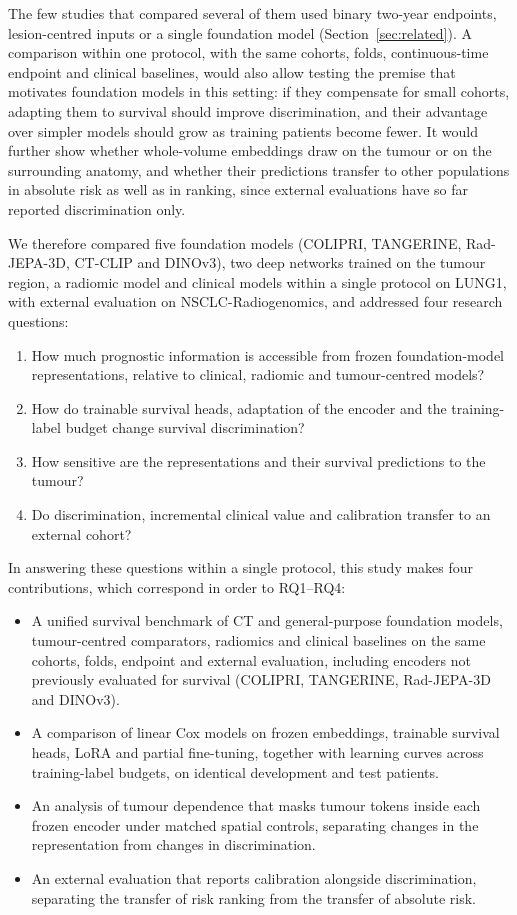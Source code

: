 The few studies that compared several of them used binary two-year endpoints, lesion-centred inputs or a single foundation model (Section~\ref{sec:related}).\cite{aerts2025tib,neukirch2026,allgower2026} A comparison within one protocol, with the same cohorts, folds, continuous-time endpoint and clinical baselines, would also allow testing the premise that motivates foundation models in this setting: if they compensate for small cohorts, adapting them to survival should improve discrimination, and their advantage over simpler models should grow as training patients become fewer. It would further show whether whole-volume embeddings draw on the tumour or on the surrounding anatomy, and whether their predictions transfer to other populations in absolute risk as well as in ranking, since external evaluations have so far reported discrimination only.

We therefore compared five foundation models (COLIPRI, TANGERINE, Rad-JEPA-3D, CT-CLIP and DINOv3), two deep networks trained on the tumour region, a radiomic model and clinical models within a single protocol on LUNG1, with external evaluation on NSCLC-Radiogenomics,\cite{bakr2018} and addressed four research questions:
\begin{enumerate}
\item[RQ1] How much prognostic information is accessible from frozen foundation-model representations, relative to clinical, radiomic and tumour-centred models?
\item[RQ2] How do trainable survival heads, adaptation of the encoder and the training-label budget change survival discrimination?
\item[RQ3] How sensitive are the representations and their survival predictions to the tumour?
\item[RQ4] Do discrimination, incremental clinical value and calibration transfer to an external cohort?
\end{enumerate}

In answering these questions within a single protocol, this study makes four contributions, which correspond in order to RQ1--RQ4:
\begin{itemize}
\item A unified survival benchmark of CT and general-purpose foundation models, tumour-centred comparators, radiomics and clinical baselines on the same cohorts, folds, endpoint and external evaluation, including encoders not previously evaluated for survival (COLIPRI, TANGERINE, Rad-JEPA-3D and DINOv3).
\item A comparison of linear Cox models on frozen embeddings, trainable survival heads, LoRA and partial fine-tuning, together with learning curves across training-label budgets, on identical development and test patients.
\item An analysis of tumour dependence that masks tumour tokens inside each frozen encoder under matched spatial controls, separating changes in the representation from changes in discrimination.
\item An external evaluation that reports calibration alongside discrimination, separating the transfer of risk ranking from the transfer of absolute risk.
\end{itemize}

